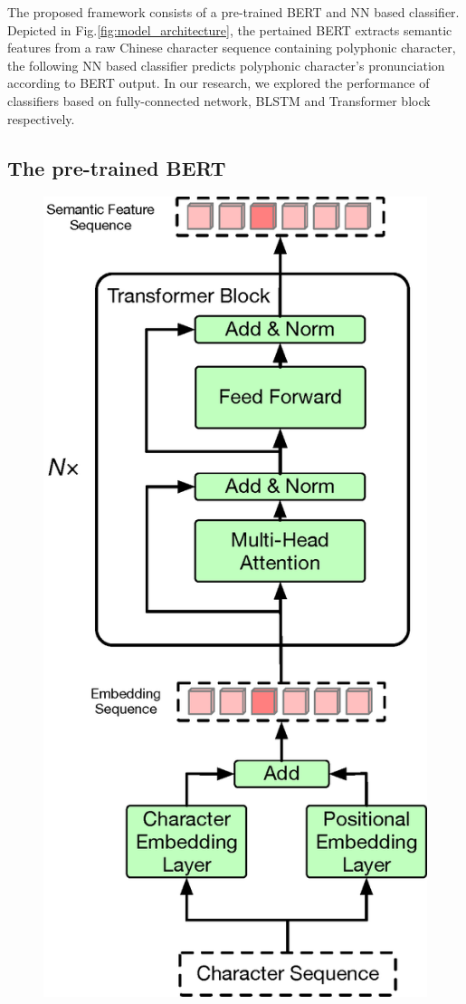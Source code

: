 \documentclass[a4paper]{article}
\begin{document}
The proposed framework consists of a pre-trained BERT and NN based classifier. Depicted in  Fig.\ref{fig:model_architecture}, the pertained BERT extracts semantic features from a raw Chinese character sequence containing polyphonic character, the following NN based classifier predicts polyphonic character's pronunciation according to BERT output. In our research, we explored the performance of classifiers based on fully-connected network, BLSTM and Transformer block respectively.


\subsection{The pre-trained BERT}

\begin{figure}[t]
	\centering
	\includegraphics[scale=0.33]{pics3/bert2.eps}

\end{figure}
\end{document}
